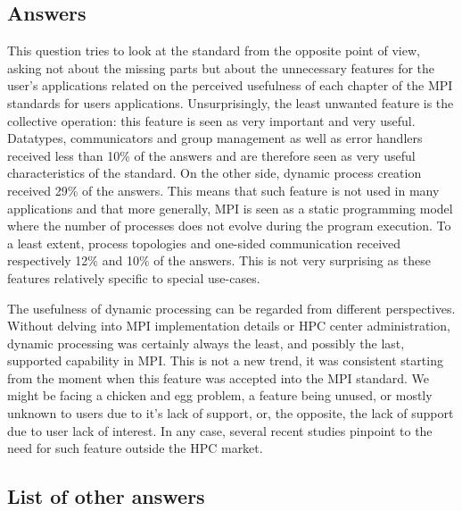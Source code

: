 
\subsection{Answers}


This question tries to look at the standard from the opposite point of view,
asking not about the missing parts but about the unnecessary features for the
user’s applications related on the perceived usefulness of each chapter of the
MPI standards for users applications. Unsurprisingly, the least unwanted feature
is the collective operation: this feature is seen as very important and very
useful. Datatypes, communicators and group management as well as  error handlers
received less than 10\% of the answers and are therefore seen as very useful
characteristics of the standard. On the other side, dynamic process creation
received 29\% of the answers. This means that such feature is not used in many
applications and that more generally, MPI is seen as a static programming model
where the number of processes does not evolve during the program execution. To a
least extent, process topologies and one-sided communication received
respectively 12\% and 10\% of the answers. This is not very surprising as these
features relatively specific to special use-cases.

The usefulness of dynamic processing can be regarded from different
perspectives. Without delving into MPI implementation details or HPC center
administration, dynamic processing was certainly always the least, and possibly
the last, supported capability in MPI. This is not a new trend, it was
consistent starting from the moment when this feature was accepted into the MPI
standard. We might be facing a chicken and egg problem, a feature being unused,
or mostly unknown to users due to it's lack of support, or, the opposite, the
lack of support due to user lack of interest. In any case, several recent
studies pinpoint to the need for such feature outside the HPC market.


\subsection{List of other answers}
\begin{itemize}

\end{itemize}

